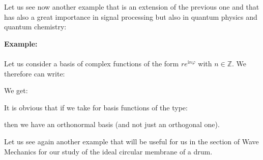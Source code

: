 	Let us see now another example that is an extension of the previous one and that has also a great importance in signal processing but also in quantum physics and quantum chemistry:
	\begin{tcolorbox}[colframe=black,colback=white,sharp corners]
	\textbf{{\Large {}}Example:}\\\\
	Let us consider a basis of complex functions of the form $r e^{\mathrm{i}n\varphi}$ with $n\in\mathbb{Z}$. We therefore can write:
	
	We get:
	
	It is obvious that if we take for basis functions of the type:
	
	then we have an orthonormal basis (and not just an orthogonal one).
	\end{tcolorbox}
	\label{orthogonality of bessel functions}
	Let us see again another example that will be useful for us in the section of Wave Mechanics for our study of the ideal circular membrane of a drum.
